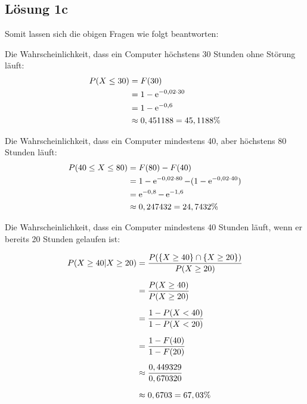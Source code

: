 \documentclass[main.tex]{subfiles}
\begin{document}
\subsection{Lösung 1c}
Somit lassen sich die obigen Fragen wie folgt beantworten:

Die Wahrscheinlichkeit, dass ein Computer höchstens 30 Stunden ohne Störung läuft:
$$\begin{aligned}
	P(X\leq 30) &= F(30) \\
	&= 1 - \operatorname{\mathrm{e}}^{-0,02 \cdot 30} \\
	&= 1 - \operatorname{\mathrm{e}}^{-0,6} \\
	&\approx 0,451188 = 45,1188 \%
\end{aligned}$$

Die Wahrscheinlichkeit, dass ein Computer mindestens 40, aber höchstens 80 Stunden läuft:
$$\begin{aligned}
	P(40\leq X\leq 80) &= F(80) - F(40)\\
	&= 1 - \operatorname{\mathrm{e}}^{-0,02 \cdot 80} - (1-\operatorname{\mathrm{e}}^{-0,02 \cdot 40}) \\
	&= \operatorname{\mathrm{e}}^{-0,8} - \operatorname{\mathrm{e}}^{-1,6} \\
	&\approx 0,247432 = 24,7432 \%
\end{aligned}$$

Die Wahrscheinlichkeit, dass ein Computer mindestens 40 Stunden läuft, wenn er bereits 20 Stunden gelaufen ist:

$$\begin{aligned}
	P(X\geq 40 | X \geq 20) &= \frac{P(\{X\geq 40\}\cap \{X\geq 20\})}{P(X\geq 20)} \\[2mm]
	&= \frac{P(X\geq 40)}{P(X\geq 20)} \\[2mm]
	&= \frac{1-P(X<40)}{1-P(X<20)} \\[2mm]
	&= \frac{1-F(40)}{1-F(20)} \\[2mm]
	&\approx \frac{0,449329}{0,670320} \\[2mm]
	&\approx 0,6703 = 67,03 \% \\[2mm]
\end{aligned}$$
\end{document}
